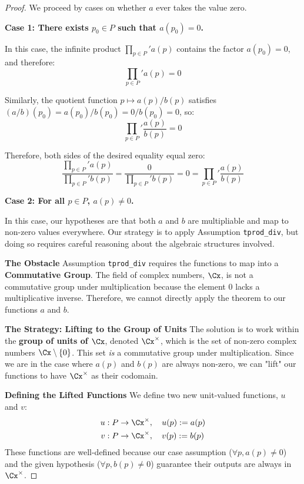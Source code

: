 \begin{proof}
\leanok
We proceed by cases on whether $a$ ever takes the value zero.

\textbf{Case 1: There exists $p_0 \in P$ such that $a(p_0) = 0$.}

In this case, the infinite product $\prod_{p \in P}' a(p)$ contains the factor $a(p_0) = 0$, and therefore:
$$\prod_{p \in P}' a(p) = 0$$

Similarly, the quotient function $p \mapsto a(p)/b(p)$ satisfies $(a/b)(p_0) = a(p_0)/b(p_0) = 0/b(p_0) = 0$, so:
$$\prod_{p \in P}' \frac{a(p)}{b(p)} = 0$$

Therefore, both sides of the desired equality equal zero:
$$\frac{\prod_{p \in P}' a(p)}{\prod_{p \in P}' b(p)} = \frac{0}{\prod_{p \in P}' b(p)} = 0 = \prod_{p \in P}' \frac{a(p)}{b(p)}$$

\textbf{Case 2: For all $p \in P$, $a(p) \neq 0$.}

In this case, our hypotheses are that both $a$ and $b$ are multipliable and map to non-zero values everywhere. Our strategy is to apply Assumption \texttt{tprod\_div}, but doing so requires careful reasoning about the algebraic structures involved.

\textbf{The Obstacle}
Assumption \texttt{tprod\_div} requires the functions to map into a \textbf{Commutative Group}. The field of complex numbers, $\Cx$, is not a commutative group under multiplication because the element $0$ lacks a multiplicative inverse. Therefore, we cannot directly apply the theorem to our functions $a$ and $b$.

\textbf{The Strategy: Lifting to the Group of Units}
The solution is to work within the \textbf{group of units of $\Cx$}, denoted $\Cx^\times$, which is the set of non-zero complex numbers $\Cx \setminus \{0\}$. This set \textit{is} a commutative group under multiplication. Since we are in the case where $a(p)$ and $b(p)$ are always non-zero, we can "lift" our functions to have $\Cx^\times$ as their codomain.

\textbf{Defining the Lifted Functions}
We define two new unit-valued functions, $u$ and $v$:
\begin{align}
u : P &\to \Cx^\times, \quad u(p) := a(p) \\
v : P &\to \Cx^\times, \quad v(p) := b(p)
\end{align}
These functions are well-defined because our case assumption ($\forall p, a(p) \neq 0$) and the given hypothesis ($\forall p, b(p) \neq 0$) guarantee their outputs are always in $\Cx^\times$.


\end{proof}
